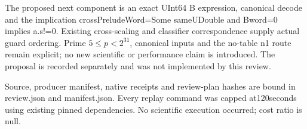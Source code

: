 \documentclass[10pt]{article}
\begin{document}
The proposed next component is an exact UInt64 B expression, canonical decode and the implication crossPreludeWord=Some sameUDouble and Bword=0 implies a.s!=0. Existing cross-scaling and classifier correspondence supply actual guard ordering. Prime $5\le p<2^{31}$, canonical inputs and the no-table n1 route remain explicit; no new scientific or performance claim is introduced. The proposal is recorded separately and was not implemented by this review.

Source, producer manifest, native receipts and review-plan hashes are bound in review.json and manifest.json. Every replay command was capped at120seconds using existing pinned dependencies. No scientific execution occurred; cost ratio is null.
\end{document}
